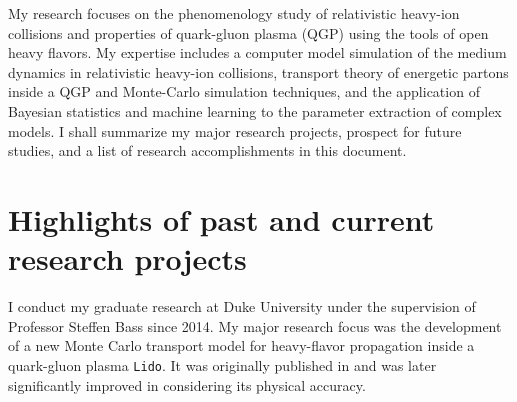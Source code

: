 \documentclass[12pt,a4paper]{article}
\begin{document}
My research focuses on the phenomenology study of relativistic heavy-ion collisions and properties of quark-gluon plasma (QGP) using the tools of open heavy flavors.
My expertise includes a computer model simulation of the medium dynamics in relativistic heavy-ion collisions, transport theory of energetic partons inside a QGP and Monte-Carlo simulation techniques, and the application of Bayesian statistics and machine learning to the parameter extraction of complex models.
I shall summarize my major research projects, prospect for future studies, and a list of research accomplishments in this document.


\section{Highlights of past and current research projects}
I conduct my graduate research at Duke University under the supervision of Professor Steffen Bass since 2014.
My major research focus was the development of a new Monte Carlo transport model for heavy-flavor propagation inside a quark-gluon plasma {\tt Lido}. It was originally published in \cite{Ke:2018tsh} and was later significantly improved in \cite{Ke:2018jem} considering its physical accuracy.
\end{document}
